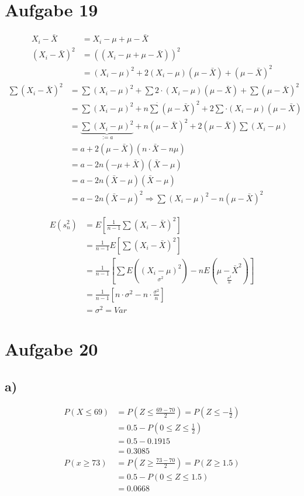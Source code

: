 \documentclass{article}
\begin{document}
\section*{Aufgabe 19}
	\begin{align*}
		X_i - \bar{X} &= X_i - \mu + \mu - \bar{X} \\
		(X_i - \bar{X})^2 &= ((X_i - \mu + \mu - \bar{X}))^2 \\
		&= (X_i - \mu)^2 + 2(X_i - \mu)(\mu - \bar{X}) + (\mu - \bar{X})^2
	\end{align*}
	\begin{align*}
		\sum(X_i - \bar{X})^2 &= \sum(X_i - \mu)^2 + \sum 2 \cdot (X_i - \mu)(\mu - \bar{X}) + \sum(\mu - \bar{X})^2\\
		&= \sum(X_i - \mu)^2  + n \dot \sum(\mu - \bar{X})^2 + 2 \sum  \cdot (X_i - \mu)(\mu - \bar{X}) \\
		&= \underbrace{\sum(X_i - \mu)^2}_{:=a} + n ( \mu - \bar{X})^2 + 2(\mu - \bar{X})\sum(X_i - \mu) \\
		&= a + 2(\mu - \bar{X})(n \cdot \bar{X} - n \mu)\\
		&= a - 2n (-\mu + \bar{X})(\bar{X} - \mu)\\
		&= a - 2n(\bar{X} - \mu)(\bar{X} - \mu)\\
		&= a - 2n(\bar{X} - \mu)^2 \Rightarrow \sum(X_i - \mu)^2 -n(\mu -\bar{X} )^2
	\end{align*}

	\begin{align*}
		E(s_n^2)&= E[\frac{1}{n-1}\sum(X_i - \bar{X})^2] \\
		&= \frac{1}{n-1} E[\sum(X_i -\bar{X})^2] \\
		&=	\frac{1}{n-1} [\sum E(\underset{\sigma^2}{(X_i-\mu)^2}) - nE(\underset{\frac{\sigma^2}{n}}{\mu-\bar{X}^2})]\\
		&= \frac{1}{n-1}[n \cdot \sigma^2 - n \cdot \frac{\sigma^2}{n}]\\
		&= \sigma^2 = Var
	\end{align*}

\section*{Aufgabe 20}
	\subsection*{a)}
		\begin{align*}
			P(X\leq 69)&= P(Z \leq \frac{69 - 70}{2}) = P(Z \leq -\frac{1}{2})\\
			&= 0.5 - P(0 \leq Z \leq \frac{1}{2})\\
			&= 0.5 - 0.1915 \\
			&= 0.3085\\
			P(x \geq 73) &= P(Z \geq \frac{73-70}{2}) = P(Z \geq 1.5)\\
				&= 0.5 - P(0 \leq Z \leq 1.5)\\
				&= 0.0668
		\end{align*}
\end{document}

